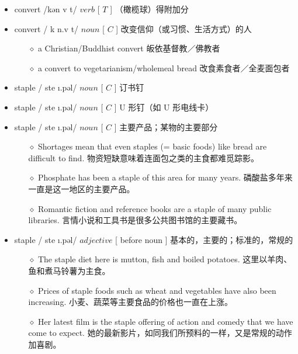 \documentclass[a4paper,top=2.5cm,buttom=2.5cm10.5pt]{book}
\begin{document}
\begin{itemize}
\item convert /kən \textprimstress v \textrevepsilon  \textlengthmark t/ $ verb $ [  $ T $  ] （橄榄球）得附加分
\end{itemize}
\begin{itemize}
\item convert / \textprimstress k \textturnscripta n.v \textrevepsilon  \textlengthmark t/ $ noun $ [  $ C $  ] 改变信仰（或习惯、生活方式）的人
\begin{itemize}
\item[$\diamond$] a Christian/Buddhist convert
皈依基督教／佛教者
\item[$\diamond$] a convert to vegetarianism/wholemeal bread
改食素食者／全麦面包者
\end{itemize}
\end{itemize}
\begin{itemize}
\item staple / \textprimstress ste \i .pəl/ $ noun $ [  $ C $  ] 订书钉
\end{itemize}
\begin{itemize}
\item staple / \textprimstress ste \i .pəl/ $ noun $ [  $ C $  ] U 形钉（如 U 形电线卡）
\end{itemize}
\begin{itemize}
\item staple / \textprimstress ste \i .pəl/ $ noun $ [  $ C $  ] 主要产品；某物的主要部分
\begin{itemize}
\item[$\diamond$] Shortages mean that even staples (= basic foods) like bread are difficult to find.
物资短缺意味着连面包之类的主食都难觅踪影。
\item[$\diamond$] Phosphate has been a staple of this area for many years.
磷酸盐多年来一直是这一地区的主要产品。
\item[$\diamond$] Romantic fiction and reference books are a staple of many public libraries.
言情小说和工具书是很多公共图书馆的主要藏书。
\end{itemize}
\end{itemize}
\begin{itemize}
\item staple / \textprimstress ste \i .pəl/ $ adjective $ [ before noun ] 基本的，主要的；标准的，常规的
\begin{itemize}
\item[$\diamond$] The staple diet here is mutton, fish and boiled potatoes.
这里以羊肉、鱼和煮马铃薯为主食。
\item[$\diamond$] Prices of staple foods such as wheat and vegetables have also been increasing.
小麦、蔬菜等主要食品的价格也一直在上涨。
\item[$\diamond$] Her latest film is the staple offering of action and comedy that we have come to expect.
她的最新影片，如同我们所预料的一样，又是常规的动作加喜剧。
\end{itemize}
\end{itemize}
\end{document}
